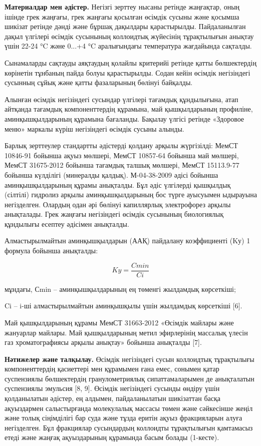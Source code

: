 \begin{multicols}{2}
{\bfseries Материалдар мен әдістер.} Негізгі зерттеу нысаны ретінде
жаңғақтар, оның ішінде грек жаңғағы, грек жаңғағы қосылған өсімдік
сусыны және қосымша шикізат ретінде дәнді және бұршақ дақылдары
қарастырылды. Пайдаланылған дақыл үлгілері өсімдік сусынының коллоидтық
жүйесінің тұрақтылығын анықтау үшін 22-24 °C және 0...+4 °C аралығындағы
температура жағдайында сақталды.

Сынамаларды сақтауды аяқтаудың қолайлы критерийі ретінде қатты
бөлшектердің көрінетін тұнбаның пайда болуы қарастырылды. Содан кейін
өсімдік негізіндегі сусынның сұйық және қатты фазаларының бөлінуі
байқалды.

Алынған өсімдік негізіндегі сусындар үлгілері тағамдық құндылығына, атап
айтқанда тағамдық компоненттердің құрамына, май қышқылдарының профиліне,
аминқышқылдарының құрамына бағаланды. Бақылау үлгісі ретінде «Здоровое
меню» маркалы күріш негізіндегі өсімдік сусыны алынды.

Барлық зерттеулер стандартты әдістерді қолдану арқылы жүргізілді: МемСТ
10846-91 бойынша ақуыз мөлшері, МемСТ 10857-64 бойынша май мөлшері,
МемСТ 31675-2012 бойынша тағамдық талшық мөлшері, МемСТ 15113.9-77
бойынша күлділігі (минералды қалдық). М-04-38-2009 әдісі бойынша
аминқышқылдарының құрамы анықталды. Бұл әдіс үлгілерді қышқылдық
(сілтілі) гидролиз арқылы аминқышқылдарының бос түрге ауысуымен
ыдырауына негізделген. Олардың одан әрі бөлінуі капиллярлық электрофорез
арқылы анықталады. Грек жаңғағы негізіндегі өсімдік сусынының
биологиялық құндылығы есептеу әдісімен анықталды.

Алмастырылмайтын аминқышқылдарын (ААҚ) пайдалану коэффициенті (Kу) 1
формула бойынша анықталды:

\begin{equation}
Ky = \frac{Cmin}{Ci}
\end{equation}

мұндағы, Сmin -- аминқышқылдарының ең төменгі жылдамдық көрсеткіші;

Ci -- i-ші алмастырылмайтын аминқышқылы үшін жылдамдық көрсеткіші
{[}6{]}.

Май қышқылдарының құрамы МемСТ 31663-2012 «Өсімдік майлары және
жануарлар майлары. Май қышқылдарының метил эфирлерінің массалық үлесін
газ хроматографиясы арқылы анықтау» бойынша анықталды {[}7{]}.

{\bfseries Нәтижелер және талқылау.} Өсімдік негізіндегі сусын коллоидтық
тұрақтылығы компоненттердің қасиеттері мен құрамымен ғана емес, сонымен
қатар суспензиялы бөлшектердің гранулометриялық сипаттамаларымен де
анықталатын суспензиялы эмульсия {[}8, 9{]}. Өсімдік негізіндегі сусынды
өндіру үшін қолданылатын әдістер, ең алдымен, пайдаланылатын шикізаттан
басқа ақуыздармен салыстырғанда молекулалық массасы төмен және
сәйкесінше жеңіл және толық сіңімділігі бар суда және тұзда еритін ақуыз
фракцияларын алуға негізделген. Бұл фракциялар сусындардың коллоидты
тұрақтылығын қамтамасыз етеді және жаңғақ ақуыздарының құрамында басым
болады (1-кесте).
\end{multicols}

